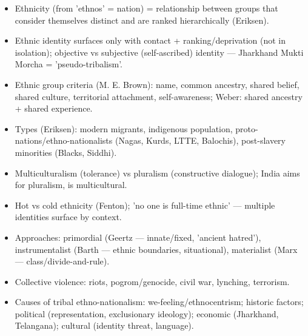 \begin{QuickRevision}
\begin{itemize}
\item Ethnicity (from 'ethnos' = nation) = relationship between groups that consider themselves distinct and are ranked hierarchically (Eriksen).
\item Ethnic identity surfaces only with contact + ranking/deprivation (not in isolation); objective vs subjective (self-ascribed) identity --- Jharkhand Mukti Morcha = 'pseudo-tribalism'.
\item Ethnic group criteria (M. E. Brown): name, common ancestry, shared belief, shared culture, territorial attachment, self-awareness; Weber: shared ancestry + shared experience.
\item Types (Eriksen): modern migrants, indigenous population, proto-nations/ethno-nationalists (Nagas, Kurds, LTTE, Balochis), post-slavery minorities (Blacks, Siddhi).
\item Multiculturalism (tolerance) vs pluralism (constructive dialogue); India aims for pluralism, is multicultural.
\item Hot vs cold ethnicity (Fenton); 'no one is full-time ethnic' --- multiple identities surface by context.
\item Approaches: primordial (Geertz --- innate/fixed, 'ancient hatred'), instrumentalist (Barth --- ethnic boundaries, situational), materialist (Marx --- class/divide-and-rule).
\item Collective violence: riots, pogrom/genocide, civil war, lynching, terrorism.
\item Causes of tribal ethno-nationalism: we-feeling/ethnocentrism; historic factors; political (representation, exclusionary ideology); economic (Jharkhand, Telangana); cultural (identity threat, language).
\end{itemize}
\end{QuickRevision}

